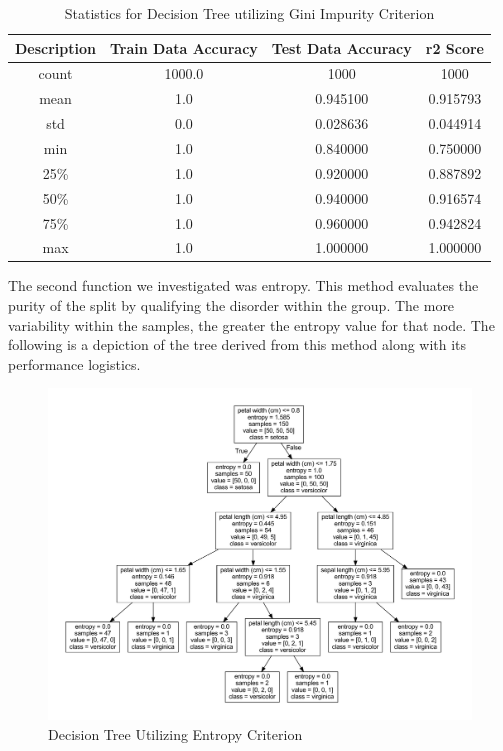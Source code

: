 \documentclass[journal]{IEEEtran}
\begin{document}
\begin{table}[h!]
\centering
\begin{tabular}{ c | c c c }
    Description & Train Data Accuracy & Test Data Accuracy & r2 Score \\ 
\hline
count & 1000.0    & 1000 & 1000  \\
mean  &    1.0    &    0.945100   &  0.915793 \\
std   &    0.0    &    0.028636   &  0.044914 \\
min   &    1.0    &    0.840000   &  0.750000 \\
25\%  &     1.0   &     0.920000  &   0.887892 \\
50\%  &     1.0   &     0.940000  &   0.916574 \\
75\%  &     1.0   &     0.960000  &   0.942824 \\
max   &   1.0     &   1.000000    & 1.000000
\end{tabular}
\caption{Statistics for Decision Tree utilizing Gini Impurity Criterion}
\label{table:dtGI}
\end{table}

The second function we investigated was entropy. This method evaluates the purity of the split by qualifying the disorder within the group. The more variability within the samples, the greater the entropy value for that node. The following is a depiction of the tree derived from this method along with its performance logistics. 

\begin{figure}[h!]
\includegraphics[scale=0.25]{iris2.pdf}
\centering
\caption{Decision Tree Utilizing Entropy Criterion}
\label{fig:dtEn}
\end{figure}
\end{document}
